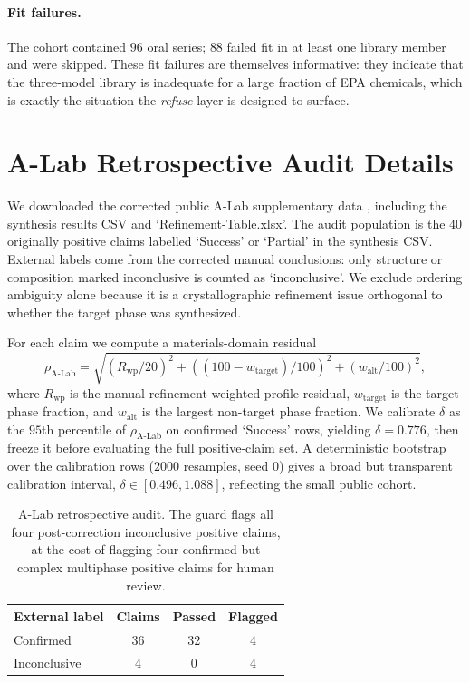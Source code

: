\documentclass{article}
\theoremstyle{plain}
\theoremstyle{definition}
\theoremstyle{remark}
\begin{document}
\paragraph{Fit failures.}
The cohort contained $96$ oral series; $88$ failed fit in at least one
library member and were skipped. These fit failures are themselves
informative: they indicate that the three-model library is inadequate for
a large fraction of EPA chemicals, which is exactly the situation the
\emph{refuse} layer is designed to surface.

\section{A-Lab Retrospective Audit Details}
\label{app:alab}

We downloaded the corrected public A-Lab supplementary data
\citep{szymanski2023alab,szymanski2026correction}, including the synthesis
results CSV and `Refinement-Table.xlsx'. The audit population is the $40$
originally positive claims labelled `Success' or `Partial' in the synthesis
CSV. External labels come from the corrected manual conclusions: only
structure or composition marked inconclusive is counted as `inconclusive'.
We exclude ordering ambiguity alone because it is a crystallographic
refinement issue orthogonal to whether the target phase was synthesized.

For each claim we compute a materials-domain residual
\[
\rho_{\mathrm{A\text{-}Lab}}
=\sqrt{(R_{\mathrm{wp}}/20)^2
       + ((100-w_{\mathrm{target}})/100)^2
       + (w_{\mathrm{alt}}/100)^2},
\]
where $R_{\mathrm{wp}}$ is the manual-refinement weighted-profile residual,
$w_{\mathrm{target}}$ is the target phase fraction, and $w_{\mathrm{alt}}$
is the largest non-target phase fraction. We calibrate $\delta$ as the
$95$th percentile of $\rho_{\mathrm{A\text{-}Lab}}$ on confirmed `Success'
rows, yielding $\delta=0.776$, then freeze it before evaluating the full
positive-claim set. A deterministic bootstrap over the calibration rows
($2000$ resamples, seed $0$) gives a broad but transparent calibration
interval, $\delta\in[0.496,1.088]$, reflecting the small public cohort.

\begin{table}[h]
\caption{A-Lab retrospective audit. The guard flags all four
post-correction inconclusive positive claims, at the cost of flagging four
confirmed but complex multiphase positive claims for human review.}
\centering
\small
\begin{tabular}{l c c c}
\toprule
External label & Claims & Passed & Flagged \\
\midrule
Confirmed & 36 & 32 & 4 \\
Inconclusive & 4 & 0 & 4 \\
\bottomrule
\end{tabular}
\end{table}
\end{document}

